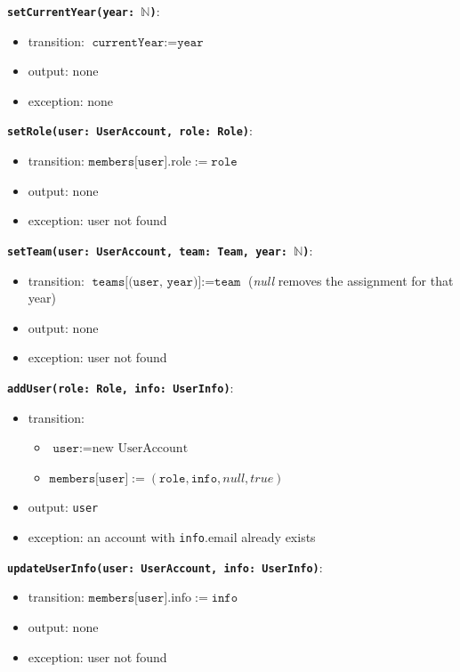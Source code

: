 \documentclass[12pt, titlepage]{article}
\begin{document}
\textbf{\texttt{setCurrentYear(year: $\mathbb{N}$)}}:
\begin{itemize}
  \item transition: $\texttt{currentYear} := \texttt{year}$
  \item output: none
  \item exception: none
\end{itemize}

\textbf{\texttt{setRole(user: UserAccount, role: Role)}}:
\begin{itemize}
  \item transition: $\texttt{members[user]}.\text{role} := \texttt{role}$
  \item output: none
  \item exception: user not found
\end{itemize}

\textbf{\texttt{setTeam(user: UserAccount, team: Team, year: $\mathbb{N}$)}}:
\begin{itemize}
  \item transition: $\texttt{teams[(user, year)]} := \texttt{team}$ (\textit{null} removes the assignment for that year)
  \item output: none
  \item exception: user not found
\end{itemize}

\textbf{\texttt{addUser(role: Role, info: UserInfo)}}:
\begin{itemize}
  \item transition:
  \begin{itemize}
    \item $\texttt{user} := \text{new UserAccount}$
    \item $\texttt{members[user]} := (\texttt{role}, \texttt{info}, \textit{null}, \textit{true})$
  \end{itemize}
  \item output: \texttt{user}
  \item exception: an account with \texttt{info}.email already exists
\end{itemize}

\textbf{\texttt{updateUserInfo(user: UserAccount, info: UserInfo)}}:
\begin{itemize}
  \item transition: $\texttt{members[user]}.\text{info} := \texttt{info}$
  \item output: none
  \item exception: user not found
\end{itemize}
\end{document}
